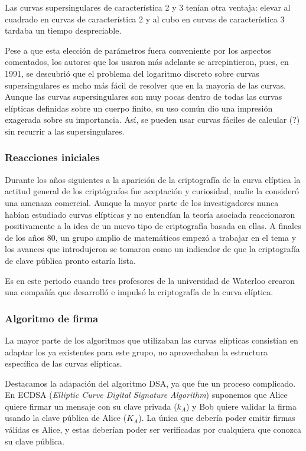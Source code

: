 \documentclass[
  a4paper,
  12pt,
  spanish,
]{scrartcl}
\begin{document}
Las curvas supersingulares de característica 2 y 3 tenían otra ventaja: elevar al cuadrado en curvas de característica 2 y al cubo en curvas de característica 3 tardaba un tiempo despreciable.

Pese a que esta elección de parámetros fuera conveniente por los aspectos comentados, los autores que los usaron más adelante se arrepintieron, pues, en 1991, se descubrió que el problema del logaritmo discreto sobre curvas supersingulares es mcho más fácil de resolver que en la mayoría de las curvas. Aunque las curvas supersingulares son muy pocas dentro de todas las curvas elípticas definidas sobre un cuerpo finito, su uso común dio una impresión exagerada sobre su importancia. Así, se pueden usar curvas fáciles de calcular (?)  sin recurrir a las supersingulares.

\subsubsection{Reacciones iniciales}
Durante los años siguientes a la aparición de la criptografía de la curva elíptica la actitud general de los criptógrafos fue aceptación y curiosidad, nadie la consideró una amenaza comercial. Aunque la mayor parte de los investigadores nunca habían estudiado curvas elípticas y no entendían la teoría asociada reaccionaron positivamente a la idea de un nuevo tipo de criptografía basada en ellas. A finales de los años 80, un grupo amplio de matemáticos empezó a trabajar en el tema y los avances que introdujeron se tomaron como un indicador de que la criptografía de clave pública pronto estaría lista.

Es en este periodo cuando tres profesores de la universidad de Waterloo crearon una compañía que desarrolló e impulsó la criptografía de la curva elíptica. 


\subsubsection{Algoritmo de firma}

La mayor parte de los algoritmos que utilizaban las curvas elípticas consistían en adaptar los ya existentes para este grupo, no aprovechaban la estructura específica de las curvas elípticas.

Destacamos la adapación del algoritmo DSA, ya que fue un proceso complicado. En ECDSA (\textit{Elliptic Curve Digital Signature Algorithm}) suponemos que Alice quiere firmar un mensaje con su clave privada ($k_A$) y Bob quiere validar la firma usando la clave pública de Alice ($K_A$). La única que debería poder emitir firmas válidas es Alice, y estas deberían poder ser verificadas por cualquiera que conozca su clave pública.
\end{document}
